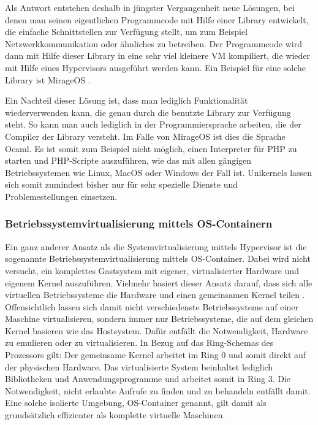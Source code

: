 Als Antwort entstehen deshalb in jüngster Vergangenheit neue Lösungen, bei denen man seinen eigentlichen Programmcode mit Hilfe einer Library entwickelt, die einfache Schnittstellen zur Verfügung stellt, um zum Beispiel Netzwerkkommunikation oder ähnliches zu betreiben. Der Programmcode wird dann mit Hilfe dieser Library in eine sehr viel kleinere \ac{VM} kompiliert, die wieder mit Hilfe eines Hypervisors ausgeführt werden kann. Ein Beispiel für eine solche Library ist MirageOS \citep[Vgl.][]{MadMorAnd13}.

Ein Nachteil dieser Lösung ist, dass man lediglich Funktionalität wiederverwenden kann, die genau durch die benutzte Library zur Verfügung steht. So kann man auch lediglich in der Programmiersprache arbeiten, die der Compiler der Library versteht. Im Falle von MirageOS ist dies die Sprache Ocaml. Es ist somit zum Beispiel nicht möglich, einen Interpreter für \ac{PHP} zu starten und PHP-Scripte auszuführen, wie das mit allen gängigen Betriebssystemen wie Linux, MacOS oder Windows der Fall ist. Unikernels lassen sich somit zumindest bisher nur für sehr spezielle Dienste und Problemestellungen einsetzen.

\subsubsection{Betriebssystemvirtualisierung mittels OS-Containern}

Ein ganz anderer Ansatz als die Systemvirtualisierung mittels Hypervisor ist die sogenannte Betriebssystemvirtualisierung mittels OS-Container. Dabei wird nicht versucht, ein komplettes Gastsystem mit eigener, virtualisierter Hardware und eigenem Kernel auszuführen. Vielmehr basiert dieser Ansatz darauf, dass sich alle virtuellen Betriebssysteme die Hardware und einen gemeinsamen Kernel teilen \citep[Vgl.][Introduction]{Turnball14}. Offensichtlich lassen sich damit nicht verschiedenste Betriebssysteme auf einer Maschine virtualisieren, sondern immer nur Betriebssysteme, die auf dem gleichen Kernel basieren wie das Hostsystem. Dafür entfällt die Notwendigkeit, Hardware zu emulieren oder zu virtualisieren. In Bezug auf das Ring-Schemas des Prozessors gilt: Der gemeinsame Kernel arbeitet im Ring 0 und somit direkt auf der physischen Hardware. Das virtualisierte System beinhaltet lediglich Bibliotheken und Anwendungsprogramme und arbeitet somit in Ring 3. Die Notwendigkeit, nicht erlaubte Aufrufe zu finden und zu behandeln entfällt damit. Eine solche isolierte Umgebung, OS-Container genannt, gilt damit als grundsätzlich effizienter als komplette virtuelle Maschinen.

